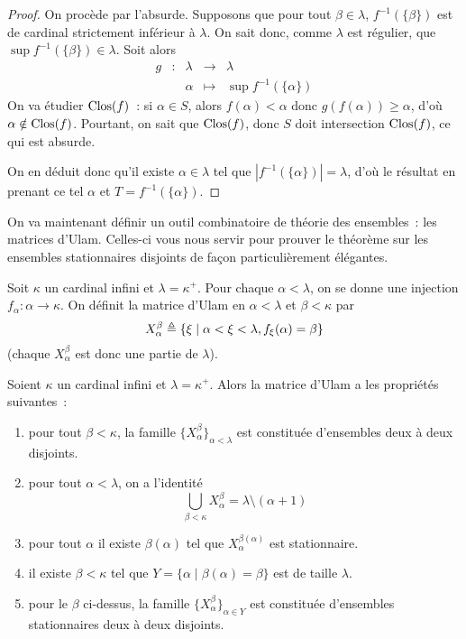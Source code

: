 \begin{proof}
  On procède par l'absurde. Supposons que pour tout $\beta \in \lambda$,
  $f^{-1}(\{\beta\})$ est de cardinal strictement inférieur à $\lambda$. On sait
  donc, comme $\lambda$ est régulier, que $\sup f^{-1}(\{\beta\})\in \lambda$.
  Soit alors
  \[\begin{array}{ccccc}
  g & : & \lambda & \longrightarrow & \lambda\\
  & & \alpha & \longmapsto & \sup f^{-1}(\{\alpha\})
  \end{array}\]
  On va étudier $\operatorname{Clos}(f)$~: si $\alpha \in S$, alors $f(\alpha) < \alpha$ donc
  $g(f(\alpha)) \geq \alpha$, d'où $\alpha \notin \operatorname{Clos}(f)$. Pourtant, on sait
  que $\operatorname{Clos}(f)$, donc $S$ doit intersection $\operatorname{Clos}(f)$, ce qui est absurde.

  On en déduit donc qu'il existe $\alpha \in \lambda$ tel que
  $|f^{-1}(\{\alpha\})| = \lambda$, d'où le résultat en prenant ce tel $\alpha$
  et $T = f^{-1}(\{\alpha\})$.
\end{proof}

On va maintenant définir un outil combinatoire de théorie des ensembles~: les
matrices d'Ulam. Celles-ci vous nous servir pour prouver le théorème sur les
ensembles stationnaires disjoints de façon particulièrement élégantes.

\begin{definition}
  Soit $\kappa$ un cardinal infini et $\lambda = \kappa^+$. Pour chaque
  $\alpha < \lambda$, on se donne une injection $f_\alpha : \alpha \to\kappa$.
  On définit la matrice d'Ulam en $\alpha < \lambda$ et $\beta < \kappa$ par
  \[X_\alpha^\beta \triangleq
  \{\xi \mid \alpha < \xi < \lambda, f_\xi(\alpha) = \beta\}\]
  (chaque $X_\alpha^\beta$ est donc une partie de $\lambda$).
\end{definition}

\begin{property}
  Soient $\kappa$ un cardinal infini et $\lambda = \kappa^+$. Alors la matrice
  d'Ulam a les propriétés suivantes~:
  \begin{enumerate}[label=(\roman*)]
  \item\label{enum.ulam1} pour tout $\beta < \kappa$, la famille
    $\{X_\alpha^\beta\}_{\alpha < \lambda}$ est constituée d'ensembles deux à deux
    disjoints.
  \item\label{enum.ulam2} pour tout $\alpha < \lambda$, on a l'identité
    \[\bigcup_{\beta < \kappa} X_\alpha^\beta = \lambda \setminus (\alpha + 1)\]
  \item pour tout $\alpha$ il existe $\beta(\alpha)$ tel que
    $X_\alpha^{\beta(\alpha)}$ est stationnaire.
  \item il existe $\beta < \kappa$ tel que
    $Y = \{\alpha \mid \beta(\alpha) = \beta\}$ est de taille $\lambda$.
  \item pour le $\beta$ ci-dessus, la famille
    $\{X_\alpha^\beta\}_{\alpha \in Y}$ est constituée d'ensembles stationnaires
    deux à deux disjoints.
  \end{enumerate}
\end{property}

